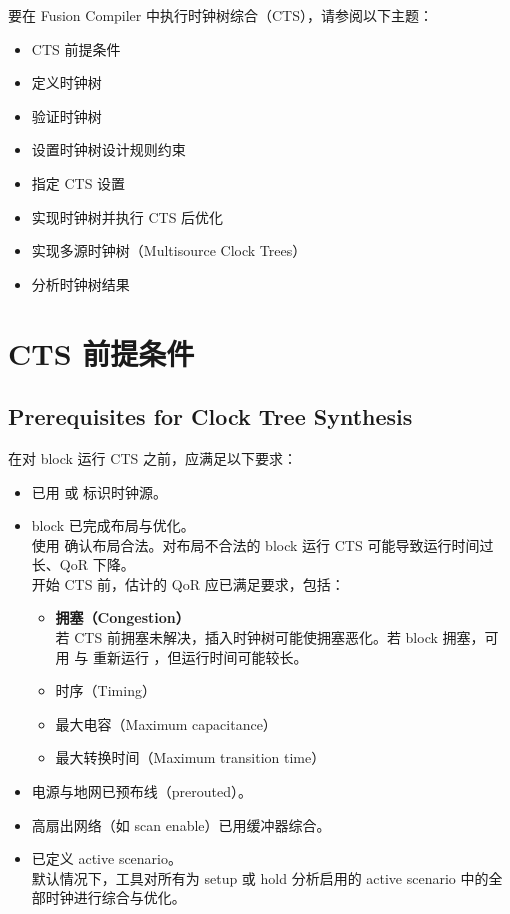 \label{chap:cts}

要在 Fusion Compiler 中执行时钟树综合（CTS），请参阅以下主题：
\begin{itemize}
  \item CTS 前提条件
  \item 定义时钟树
  \item 验证时钟树
  \item 设置时钟树设计规则约束
  \item 指定 CTS 设置
  \item 实现时钟树并执行 CTS 后优化
  \item 实现多源时钟树（Multisource Clock Trees）
  \item 分析时钟树结果
\end{itemize}

\section{CTS 前提条件}
\subsection*{Prerequisites for Clock Tree Synthesis}

在对 block 运行 CTS 之前，应满足以下要求：
\begin{itemize}
  \item 已用  或  标识时钟源。
  \item block 已完成布局与优化。\\
        使用  确认布局合法。对布局不合法的 block 运行 CTS 可能导致运行时间过长、QoR 下降。\\
        开始 CTS 前，估计的 QoR 应已满足要求，包括：
        \begin{itemize}
          \item \textbf{拥塞（Congestion）}\\
                若 CTS 前拥塞未解决，插入时钟树可能使拥塞恶化。若 block 拥塞，可用  与  重新运行 ，但运行时间可能较长。
          \item 时序（Timing）
          \item 最大电容（Maximum capacitance）
          \item 最大转换时间（Maximum transition time）
        \end{itemize}
  \item 电源与地网已预布线（prerouted）。
  \item 高扇出网络（如 scan enable）已用缓冲器综合。
  \item 已定义 active scenario。\\
        默认情况下，工具对所有为 setup 或 hold 分析启用的 active scenario 中的全部时钟进行综合与优化。
\end{itemize}

